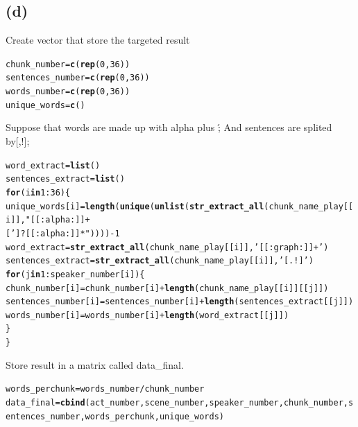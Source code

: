 \documentclass{article}\usepackage[]{graphicx}\usepackage[]{color}
\makeatletter
\newcommand{\hlnum}[1]{\textcolor[rgb]{0.686,0.059,0.569}{#1}}%
\newcommand{\hlstr}[1]{\textcolor[rgb]{0.192,0.494,0.8}{#1}}%
\newcommand{\hlopt}[1]{\textcolor[rgb]{0,0,0}{#1}}%
\newcommand{\hlstd}[1]{\textcolor[rgb]{0.345,0.345,0.345}{#1}}%
\newcommand{\hlkwa}[1]{\textcolor[rgb]{0.161,0.373,0.58}{\textbf{#1}}}%
\newcommand{\hlkwb}[1]{\textcolor[rgb]{0.69,0.353,0.396}{#1}}%
\newcommand{\hlkwd}[1]{\textcolor[rgb]{0.737,0.353,0.396}{\textbf{#1}}}%
\newenvironment{kframe}{%
 \def\at@end@of@kframe{}%
 \ifinner\ifhmode%
  \def\at@end@of@kframe{\end{minipage}}%
  \begin{minipage}{\columnwidth}%
 \fi\fi%
 \def\FrameCommand##1{\hskip\@totalleftmargin \hskip-\fboxsep
 \colorbox{shadecolor}{##1}\hskip-\fboxsep
     \hskip-\linewidth \hskip-\@totalleftmargin \hskip\columnwidth}%
 \MakeFramed {\advance\hsize-\width
   \@totalleftmargin\z@ \linewidth\hsize
   \@setminipage}}%
 {\par\unskip\endMakeFramed%
 \at@end@of@kframe}
\newenvironment{knitrout}{}{} %
\makeatother
\begin{document}
\subsection{(d)}

Create vector that store the targeted result
\begin{knitrout}
\color{fgcolor}\begin{kframe}
\begin{alltt}
\hlstd{chunk_number}\hlkwb{=}\hlkwd{c}\hlstd{(}\hlkwd{rep}\hlstd{(}\hlnum{0}\hlstd{,}\hlnum{36}\hlstd{))}
\hlstd{sentences_number}\hlkwb{=}\hlkwd{c}\hlstd{(}\hlkwd{rep}\hlstd{(}\hlnum{0}\hlstd{,}\hlnum{36}\hlstd{))}
\hlstd{words_number}\hlkwb{=}\hlkwd{c}\hlstd{(}\hlkwd{rep}\hlstd{(}\hlnum{0}\hlstd{,}\hlnum{36}\hlstd{))}
\hlstd{unique_words}\hlkwb{=}\hlkwd{c}\hlstd{()}
\end{alltt}
\end{kframe}
\end{knitrout}

Suppose that words are made up with alpha plus \'; And sentences are splited by{[,!]}; 
\begin{knitrout}
\color{fgcolor}\begin{kframe}
\begin{alltt}
\hlstd{word_extract}\hlkwb{=}\hlkwd{list}\hlstd{()}
\hlstd{sentences_extract}\hlkwb{=}\hlkwd{list}\hlstd{()}
\hlkwa{for}\hlstd{(i} \hlkwa{in} \hlnum{1}\hlopt{:}\hlnum{36}\hlstd{)\{}
  \hlstd{unique_words[i]}\hlkwb{=}\hlkwd{length}\hlstd{(}\hlkwd{unique}\hlstd{(}\hlkwd{unlist}\hlstd{(}\hlkwd{str_extract_all}\hlstd{(chunk_name_play[[i]],}\hlstr{"[[:alpha:]]+
[']?[[:alpha:]]*"}\hlstd{))))}\hlopt{-}\hlnum{1}
  \hlstd{word_extract}\hlkwb{=}\hlkwd{str_extract_all}\hlstd{(chunk_name_play[[i]],}\hlstr{'[[:graph:]]+'}\hlstd{)}
  \hlstd{sentences_extract}\hlkwb{=}\hlkwd{str_extract_all}\hlstd{(chunk_name_play[[i]],}\hlstr{'[.!]'}\hlstd{)}
  \hlkwa{for} \hlstd{(j} \hlkwa{in} \hlnum{1}\hlopt{:}\hlstd{speaker_number[i])\{}
    \hlstd{chunk_number[i]}\hlkwb{=}\hlstd{chunk_number[i]}\hlopt{+}\hlkwd{length}\hlstd{(chunk_name_play[[i]][[j]])}
    \hlstd{sentences_number[i]}\hlkwb{=}\hlstd{sentences_number[i]}\hlopt{+}\hlkwd{length}\hlstd{(sentences_extract[[j]])}
    \hlstd{words_number[i]}\hlkwb{=}\hlstd{words_number[i]}\hlopt{+}\hlkwd{length}\hlstd{(word_extract[[j]])}
  \hlstd{\}}
\hlstd{\}}
\end{alltt}
\end{kframe}
\end{knitrout}
Store result in a matrix called data\_final.
\begin{knitrout}
\color{fgcolor}\begin{kframe}
\begin{alltt}
\hlstd{words_perchunk}\hlkwb{=}\hlstd{words_number}\hlopt{/}\hlstd{chunk_number}
\hlstd{data_final}\hlkwb{=}\hlkwd{cbind}\hlstd{(act_number,scene_number,speaker_number,chunk_number,sentences_number,words_perchunk,unique_words)}
\end{alltt}
\end{kframe}
\end{knitrout}
\end{document}
